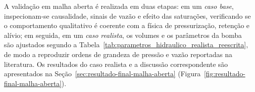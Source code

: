 \begin{table}[htbp]
\end{table}

A validação em malha aberta é realizada em duas etapas: em um \emph{caso base}, inspecionam-se causalidade, sinais de vazão e efeito das saturações, verificando se o comportamento qualitativo é coerente com a física de pressurização, retenção e alívio; em seguida, em um \emph{caso realista}, os volumes e os parâmetros da bomba são ajustados segundo a Tabela~\ref{tab:parametros_hidraulico_realista_reescrita}, de modo a reproduzir ordens de grandeza de pressão e vazão reportadas na literatura. Os resultados do caso realista e a discussão correspondente são apresentados na Seção~\ref{sec:resultado-final-malha-aberta} (Figura~\ref{fig:resultado-final-malha-aberta}).



